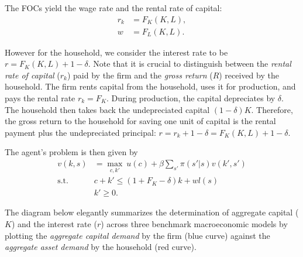 The FOCs yield the wage rate and the rental rate of capital:
\[
\begin{aligned}
    r_k & = F_K(K,L),\\
    w & = F_L(K,L).
\end{aligned}
\]

However for the household, we consider the interest rate to be $r = F_K(K,L) + 1 - \delta$. Note that it is crucial to distinguish between the \textit{rental rate of capital} ($r_k$) paid by the firm and the \textit{gross return} ($R$) received by the household. The firm rents capital from the household, uses it for production, and pays the rental rate $r_k = F_K$. During production, the capital depreciates by $\delta$. The household then takes back the undepreciated capital $(1-\delta)K$. Therefore, the gross return to the household for saving one unit of capital is the rental payment plus the undepreciated principal: $r = r_k + 1 - \delta = F_K(K,L) + 1 - \delta$.

The agent's problem is then given by
\[
\begin{aligned}
    v(k,s) & = \max_{c,k'} \ u(c) + \beta \sum_{s'}\pi(s'|s)v(k',s')\\
\text{s.t. } & c + k' \le (1+F_K-\delta)k + wl(s)\\
& k' \ge 0.
\end{aligned}
\]

The diagram below elegantly summarizes the determination of aggregate capital ($K$) and the interest rate ($r$) across three benchmark macroeconomic models by plotting the \textit{aggregate capital demand} by the firm (blue curve) against the \textit{aggregate asset demand} by the household (red curve). 

